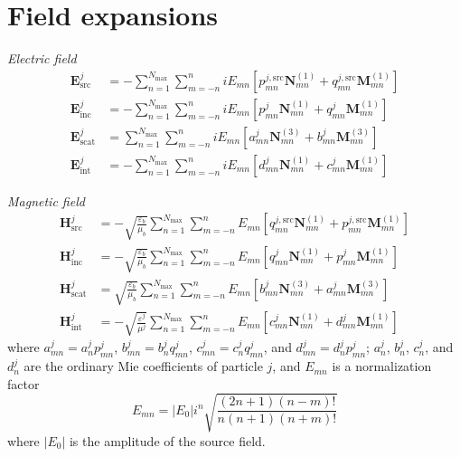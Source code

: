 \documentclass[11pt]{article}
\begin{document}
\section{Field expansions}
\textit{Electric field}
\begin{align}
    \boldsymbol{E}_\text{src}^j &= - \sum_{n=1}^{N_\text{max}} \sum_{m=-n}^{n}
    iE_{mn} \left[ p_{mn}^{j,\text{src}} \boldsymbol{N}_{mn}^{(1)} + q_{mn}^{j,\text{src}} \boldsymbol{M}_{mn}^{(1)} \right] \\
    \boldsymbol{E}_\text{inc}^j &= - \sum_{n=1}^{N_\text{max}} \sum_{m=-n}^{n}
    iE_{mn} \left[ p_{mn}^j \boldsymbol{N}_{mn}^{(1)} + q_{mn}^j \boldsymbol{M}_{mn}^{(1)} \right] \\
    \boldsymbol{E}_\text{scat}^j &= \sum_{n=1}^{N_\text{max}} \sum_{m=-n}^{n}
    iE_{mn} \left[a_{mn}^j \boldsymbol{N}_{mn}^{(3)} + b_{mn}^j \boldsymbol{M}_{mn}^{(3)} \right] \\
    \boldsymbol{E}_\text{int}^j &= - \sum_{n=1}^{N_\text{max}} \sum_{m=-n}^{n}
    iE_{mn} \left[ d_{mn}^j \boldsymbol{N}_{mn}^{(1)} + c_{mn}^j \boldsymbol{M}_{mn}^{(1)} \right]
\end{align}

\textit{Magnetic field}
\begin{align}
    \boldsymbol{H}_\text{src}^j &= - \sqrt{\frac{\varepsilon_b}{\mu_b}} \sum_{n=1}^{N_\text{max}} \sum_{m=-n}^{n}
    E_{mn} \left[ q_{mn}^{j,\text{src}} \boldsymbol{N}_{mn}^{(1)} + p_{mn}^{j,\text{src}} \boldsymbol{M}_{mn}^{(1)} \right] \\
    \boldsymbol{H}_\text{inc}^j &= - \sqrt{\frac{\varepsilon_b}{\mu_b}} \sum_{n=1}^{N_\text{max}} \sum_{m=-n}^{n}
    E_{mn} \left[ q_{mn}^j \boldsymbol{N}_{mn}^{(1)} + p_{mn}^j \boldsymbol{M}_{mn}^{(1)} \right] \\
    \boldsymbol{H}_\text{scat}^j &= \sqrt{\frac{\varepsilon_b}{\mu_b}} \sum_{n=1}^{N_\text{max}} \sum_{m=-n}^{n}
    E_{mn} \left[b_{mn}^j \boldsymbol{N}_{mn}^{(3)} + a_{mn}^j \boldsymbol{M}_{mn}^{(3)} \right] \\
    \boldsymbol{H}_\text{int}^j &= -\sqrt{\frac{\varepsilon^j}{\mu^j}}  \sum_{n=1}^{N_\text{max}} \sum_{m=-n}^{n}
    E_{mn} \left[ c_{mn}^j \boldsymbol{N}_{mn}^{(1)} + d_{mn}^j \boldsymbol{M}_{mn}^{(1)} \right]
\end{align}
where $a_{mn}^j = a_n^j p_{mn}^j$, $b_{mn}^j = b_n^j q_{mn}^j$, $c_{mn}^j = c_n^j q_{mn}^j$, and $d_{mn}^j = d_n^j p_{mn}^j$; $a_n^j$, $b_n^j$, $c_n^j$, and $d_n^j$ are the ordinary Mie coefficients \cite{bohren2008absorption} of particle $j$, and $E_{mn}$ is a normalization factor
\begin{equation}
    E_{mn} = |E_0|i^n \sqrt{\frac{(2n+1)(n-m)!}{n(n+1)(n+m)!}}
\end{equation}
where $|E_0|$ is the amplitude of the source field.
\end{document}
